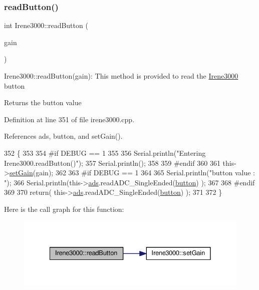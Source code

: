 \subsubsection{\texorpdfstring{read\+Button()}{readButton()}}
{\footnotesize\ttfamily int Irene3000\+::read\+Button (\begin{DoxyParamCaption}\item[{ads\+Gain\+\_\+t}]{gain }\end{DoxyParamCaption})}

Irene3000\+::read\+Button(gain)\+: This method is provided to read the \hyperlink{classIrene3000}{Irene3000} button

\begin{DoxyReturn}{Returns}
the button value 
\end{DoxyReturn}


Definition at line 351 of file irene3000.\+cpp.



References ads, button, and set\+Gain().


\begin{DoxyCode}
352 \{
353 
354 \textcolor{preprocessor}{#if DEBUG == 1 }
355 
356     Serial.println(\textcolor{stringliteral}{"Entering Irene3000.readButton()"});
357     Serial.println();
358 
359 \textcolor{preprocessor}{#endif }
360 
361     this->\hyperlink{classIrene3000_aff7c5da186b388e7272e63ff88a20c34}{setGain}(gain);
362 
363 \textcolor{preprocessor}{#if DEBUG == 1}
364     
365     Serial.println(\textcolor{stringliteral}{"button value : "});
366     Serial.println(this->\hyperlink{classIrene3000_a1215e77ba761c9908d80d691f149e135}{ads}.readADC\_SingleEnded(\hyperlink{Irene3000_8h_a37976ee6fe1fb8546bfd6153b83ffa6c}{button}) );
367 
368 \textcolor{preprocessor}{#endif }
369 
370     \textcolor{keywordflow}{return}( this->\hyperlink{classIrene3000_a1215e77ba761c9908d80d691f149e135}{ads}.readADC\_SingleEnded(\hyperlink{Irene3000_8h_a37976ee6fe1fb8546bfd6153b83ffa6c}{button}) );
371     
372 \}
\end{DoxyCode}
Here is the call graph for this function\+:\nopagebreak
\begin{figure}[H]
\begin{center}
\leavevmode
\includegraphics[width=328pt]{classIrene3000_ae0e0a5b773c3625b44c1d113c76a1540_cgraph}
\end{center}
\end{figure}
\mbox{\label{classIrene3000_abf3db725fabb0634ec889b32068a5eec}} 
